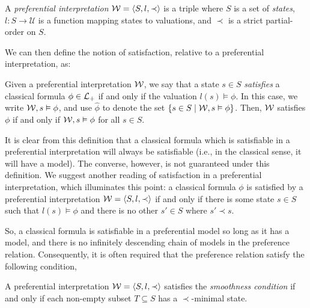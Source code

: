 \begin{definition}
	\label{definition:preferential-interpretation} 

	A \emph{preferential interpretation} $\mathcal{W} = \langle S,l,\prec \rangle$ is a triple where $S$ is a set of \emph{states}, $l: S \to \mathcal{U}$ is
	a function mapping states to valuations, and $\prec$ is a strict partial-order on $S$.
\end{definition}

We can then define the notion of satisfaction, relative to a preferential interpretation, as:

\begin{definition}
	\label{definition:state-satisfaction}

	Given a preferential interpretation $\mathcal{W}$, we say that a state $s \in S$ \emph{satisfies} a classical formula
	$\phi \in \mathcal{L}_+$ if and only if the valuation $l(s) \vDash \phi$. In this case, we write $\mathcal{W}, s \vDash \phi$, and use
	$\hat{\phi}$ to denote the set $\{s \in S \mid \mathcal{W},s \vDash \phi \}$. Then, $\mathcal{W}$ satisfies $\phi$ if and only if $\mathcal{W}
	, s \vDash \phi$ for all $s \in S$.
\end{definition}

It is clear from this definition that a classical formula which is satisfiable in a preferential interpretation will
always be satisfiable (i.e., in the classical sense, it will have a model). The converse, however, is not guaranteed
under this definition. We suggest another reading of satisfaction in a preferential interpretation, which illuminates
this point: a classical formula $\phi$ is satisfied by a preferential interpretation $\mathcal{W} = \langle S,l,\prec \rangle$ if and only if there is some
state $s \in S$ such that $l(s) \vDash \phi$ and there is no other $s'\in S$ where $s' \prec s$.

So, a classical formula is satisfiable in a preferential model so long as it has a model, and there is no infinitely descending
chain of models in the preference relation. Consequently, it is often required that the preference relation satisfy the following
condition,

\begin{definition}
	\label{definition:smoothness} 

	A preferential interpretation $\mathcal{W} = \langle S,l,\prec \rangle$ satisfies the \textit{smoothness condition} if and only if each non-empty subset $T
	\subseteq S$ has a $\prec$-minimal state.
\end{definition}

